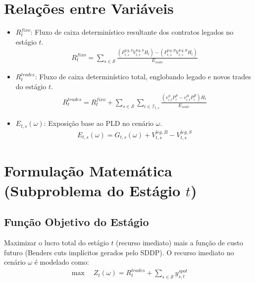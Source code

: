 \documentclass{article}
\begin{document}
\section{Relações entre Variáveis}
\begin{itemize}
    \item $R^{fixo}_t$: Fluxo de caixa determinístico resultante dos contratos legados no estágio $t$.
    \begin{align}
        R^{fixo}_t = \sum_{s \in \mathcal{S}} \frac{\left( P^{leg, S}_{t,s} V^{leg, S}_{t,s} H_t \right) - \left( P^{leg, B}_{t,s} V^{leg, B}_{t,s} H_t \right)}{E_{scale}}
    \end{align}
    
    \item $R^{trades}_t$: Fluxo de caixa determinístico total, englobando legado e novos trades do estágio $t$.
    \begin{align}
        R^{trades}_t = R^{fixo}_t + \sum_{s \in \mathcal{S}} \sum_{i \in \mathcal{I}_{t,s}} \frac{\left( v^{S}_{i,t} P^{S}_{i} - v^{B}_{i,t} P^{B}_{i} \right) H_t}{E_{scale}}
    \end{align}
    
    \item $E_{t,s}(\omega)$: Exposição base ao PLD no cenário $\omega$.
    \begin{align}
        E_{t,s}(\omega) = G_{t,s}(\omega) + V^{leg, B}_{t,s} - V^{leg, S}_{t,s}
    \end{align}
\end{itemize}

\section{Formulação Matemática (Subproblema do Estágio $t$)}

\subsection{Função Objetivo do Estágio}
Maximizar o lucro total do estágio $t$ (recurso imediato) mais a função de custo futuro (Benders cuts implícitos gerados pelo SDDP). O recurso imediato no cenário $\omega$ é modelado como:
\begin{align}
    \max \quad Z_t(\omega) = R^{trades}_t + \sum_{s \in \mathcal{S}} y^{spot}_{s,t}
\end{align}
\end{document}
